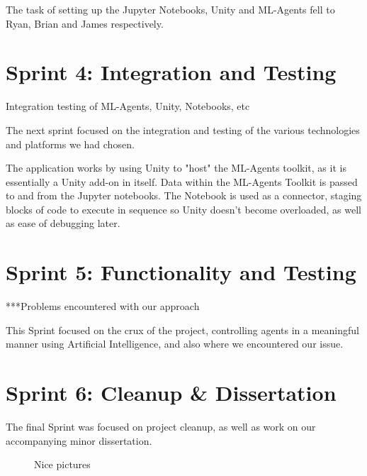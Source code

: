 	The task of setting up the Jupyter Notebooks, Unity and ML-Agents fell to Ryan, Brian and James respectively.
	

\section{Sprint 4: Integration and Testing}
	Integration testing of ML-Agents, Unity, Notebooks, etc
	
	The next sprint focused on the integration and testing of the various technologies and platforms we had chosen. 
	
	The application works by using Unity to "host" the ML-Agents toolkit, as it is essentially a Unity add-on in itself. Data within the ML-Agents Toolkit is passed to and from the Jupyter notebooks. The Notebook is used as a connector, staging blocks of code to execute in sequence so Unity doesn't become overloaded, as well as ease of debugging later.

\section{Sprint 5: Functionality and Testing}
	***Problems encountered with our approach
	
	This Sprint focused on the crux of the project, controlling agents in a meaningful manner using Artificial Intelligence, and also where we encountered our issue.

\section{Sprint 6: Cleanup \& Dissertation} 

	The final Sprint was focused on project cleanup, as well as work on our accompanying minor dissertation.



\begin{figure}
  \centering
  \caption{Nice pictures}
  \label{tikz:graphs}
\end{figure}